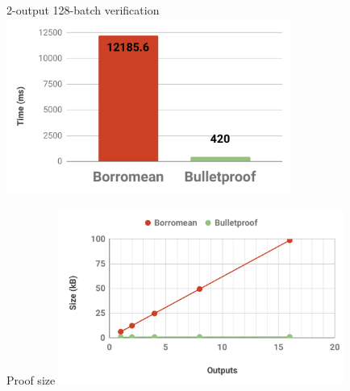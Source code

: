 \documentclass[aspectratio=169]{beamer}
\begin{document}
\begin{frame}{2-output 128-batch verification}
\centering
\includegraphics[width=0.7\textwidth]{bp-2-batch-128.pdf}
\end{frame}

\begin{frame}{Proof size}
\centering
\includegraphics[width=0.7\textwidth]{bp-size.pdf}
\end{frame}
\end{document}
